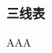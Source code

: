 \documentclass{ctexart}
\begin{document}

        \subsubsection{三线表}
            AAA
\end{document}
